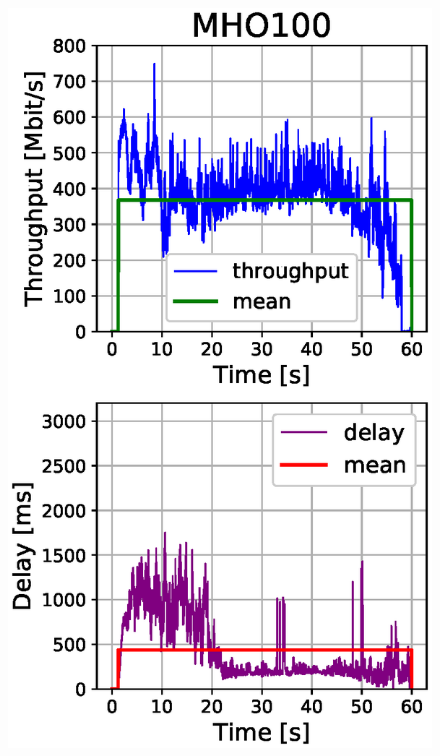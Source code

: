 \documentclass[conference,10pt]{IEEEtran}
\begin{document}
\begin{enumerate}
\begin{figure}[!t]
\begin{center}
\begin{minipage}{.245\textwidth}
		\includegraphics[width=\linewidth, keepaspectratio]{images/results_mho_100.eps}
		\label{fig:test2}
	\end{minipage}
	\begin{minipage}{.245\textwidth}
		\centering

\end{minipage}
\end{center}
\end{figure}
\end{enumerate}
\end{document}
